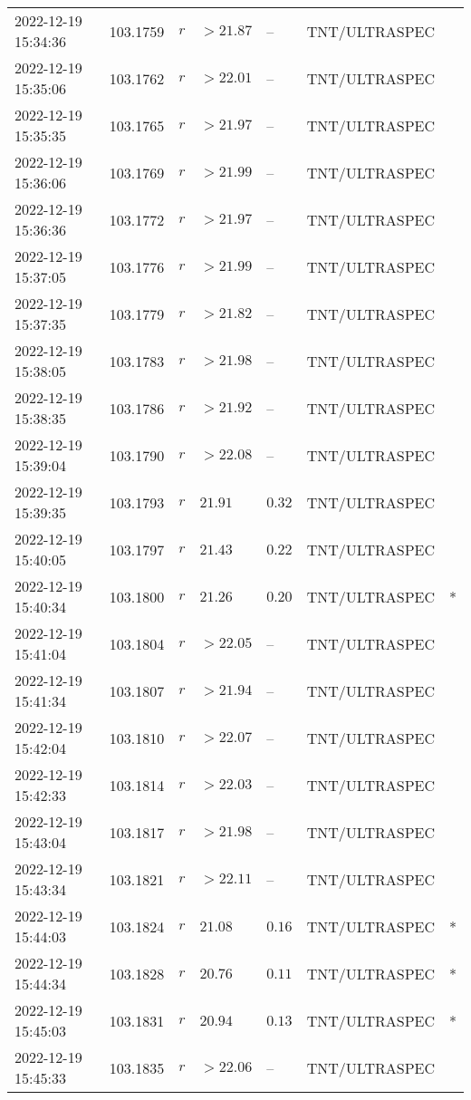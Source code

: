 \documentclass{nature_plusfigure}
\begin{document}
\begin{supplement}
\begin{center}
\begin{longtable}{lllllll}
2022-12-19 15:34:36 & 103.1759 & $r$ & $>21.87$ & -- & TNT/ULTRASPEC &  \\ 
2022-12-19 15:35:06 & 103.1762 & $r$ & $>22.01$ & -- & TNT/ULTRASPEC &  \\ 
2022-12-19 15:35:35 & 103.1765 & $r$ & $>21.97$ & -- & TNT/ULTRASPEC &  \\ 
2022-12-19 15:36:06 & 103.1769 & $r$ & $>21.99$ & -- & TNT/ULTRASPEC &  \\ 
2022-12-19 15:36:36 & 103.1772 & $r$ & $>21.97$ & -- & TNT/ULTRASPEC &  \\ 
2022-12-19 15:37:05 & 103.1776 & $r$ & $>21.99$ & -- & TNT/ULTRASPEC &  \\ 
2022-12-19 15:37:35 & 103.1779 & $r$ & $>21.82$ & -- & TNT/ULTRASPEC &  \\ 
2022-12-19 15:38:05 & 103.1783 & $r$ & $>21.98$ & -- & TNT/ULTRASPEC &  \\ 
2022-12-19 15:38:35 & 103.1786 & $r$ & $>21.92$ & -- & TNT/ULTRASPEC &  \\ 
2022-12-19 15:39:04 & 103.1790 & $r$ & $>22.08$ & -- & TNT/ULTRASPEC &  \\ 
2022-12-19 15:39:35 & 103.1793 & $r$ & $21.91$ & $0.32$ & TNT/ULTRASPEC &  \\ 
2022-12-19 15:40:05 & 103.1797 & $r$ & $21.43$ & $0.22$ & TNT/ULTRASPEC &  \\ 
2022-12-19 15:40:34 & 103.1800 & $r$ & $21.26$ & $0.20$ & TNT/ULTRASPEC & * \\ 
2022-12-19 15:41:04 & 103.1804 & $r$ & $>22.05$ & -- & TNT/ULTRASPEC &  \\ 
2022-12-19 15:41:34 & 103.1807 & $r$ & $>21.94$ & -- & TNT/ULTRASPEC &  \\ 
2022-12-19 15:42:04 & 103.1810 & $r$ & $>22.07$ & -- & TNT/ULTRASPEC &  \\ 
2022-12-19 15:42:33 & 103.1814 & $r$ & $>22.03$ & -- & TNT/ULTRASPEC &  \\ 
2022-12-19 15:43:04 & 103.1817 & $r$ & $>21.98$ & -- & TNT/ULTRASPEC &  \\ 
2022-12-19 15:43:34 & 103.1821 & $r$ & $>22.11$ & -- & TNT/ULTRASPEC &  \\ 
2022-12-19 15:44:03 & 103.1824 & $r$ & $21.08$ & $0.16$ & TNT/ULTRASPEC & * \\ 
2022-12-19 15:44:34 & 103.1828 & $r$ & $20.76$ & $0.11$ & TNT/ULTRASPEC & * \\ 
2022-12-19 15:45:03 & 103.1831 & $r$ & $20.94$ & $0.13$ & TNT/ULTRASPEC & * \\ 
2022-12-19 15:45:33 & 103.1835 & $r$ & $>22.06$ & -- & TNT/ULTRASPEC &  \\ 

\end{longtable}
\end{center}
\end{supplement}
\end{document}
